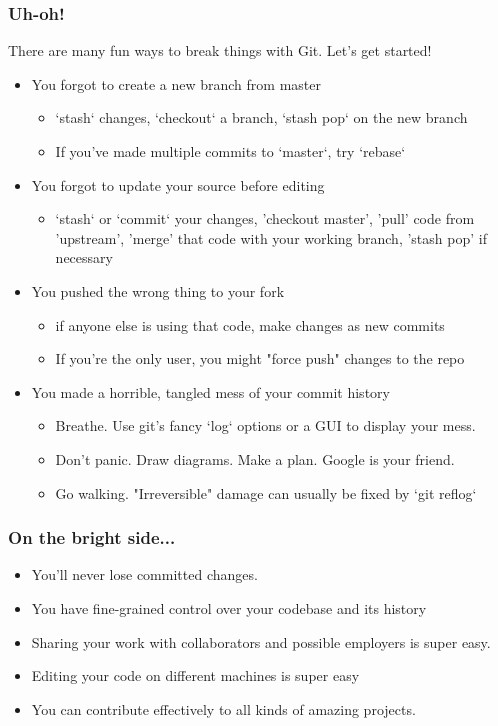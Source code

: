\documentclass[unknownkeysallowed]{beamer}
\begin{document}
\begin{frame}
    \frametitle{Uh-oh!}
    \vspace{0.25cm}
    There are many fun ways to break things with Git. Let's get started!
    \begin{itemize}
        \item{You forgot to create a new branch from master}
        \begin{itemize}
            \item{`stash` changes, `checkout` a branch, `stash pop` on the new branch}
            \item{If you've made multiple commits to `master`, try `rebase`}
        \end{itemize}
        \item{You forgot to update your source before editing}
        \begin{itemize}
            \item{`stash` or `commit` your changes, 'checkout master', 'pull' code from 'upstream', 'merge' that code with your working branch, 'stash pop' if necessary}
        \end{itemize}
        \item{You pushed the wrong thing to your fork}
        \begin{itemize}
            \item{if anyone else is using that code, make changes as new commits}
            \item{If you're the only user, you might "force push" changes to the repo}
        \end{itemize}
        \item{You made a horrible, tangled mess of your commit history}
        \begin{itemize}
            \item{Breathe. Use git's fancy `log` options or a GUI to display your mess.}
            \item{Don't panic. Draw diagrams. Make a plan. Google is your friend.}
            \item{Go walking. "Irreversible" damage can usually be fixed by `git reflog`}
        \end{itemize}
    \end{itemize}
\end{frame}

\begin{frame}
    \frametitle{On the bright side...}
    \begin{itemize}
        \item{You'll never lose committed changes.}
        \item{You have fine-grained control over your codebase and its history}
        \item{Sharing your work with collaborators and possible employers is super easy.}
        \item{Editing your code on different machines is super easy}
        \item{You can contribute effectively to all kinds of amazing projects.}
    \end{itemize}
\end{frame}
\end{document}
